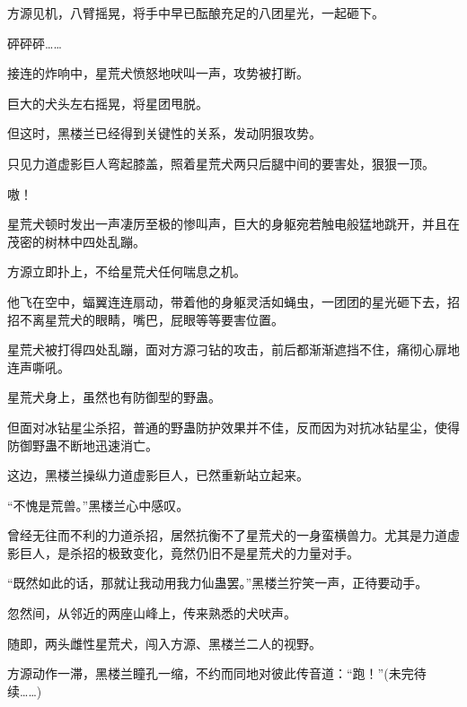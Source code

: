 \begin{this_body}
方源见机，八臂摇晃，将手中早已酝酿充足的八团星光，一起砸下。

砰砰砰……

接连的炸响中，星荒犬愤怒地吠叫一声，攻势被打断。

巨大的犬头左右摇晃，将星团甩脱。

但这时，黑楼兰已经得到关键性的关系，发动阴狠攻势。

只见力道虚影巨人弯起膝盖，照着星荒犬两只后腿中间的要害处，狠狠一顶。

嗷！

星荒犬顿时发出一声凄厉至极的惨叫声，巨大的身躯宛若触电般猛地跳开，并且在茂密的树林中四处乱蹦。

方源立即扑上，不给星荒犬任何喘息之机。

他飞在空中，蝠翼连连扇动，带着他的身躯灵活如蝇虫，一团团的星光砸下去，招招不离星荒犬的眼睛，嘴巴，屁眼等等要害位置。

星荒犬被打得四处乱蹦，面对方源刁钻的攻击，前后都渐渐遮挡不住，痛彻心扉地连声嘶吼。

星荒犬身上，虽然也有防御型的野蛊。

但面对冰钻星尘杀招，普通的野蛊防护效果并不佳，反而因为对抗冰钻星尘，使得防御野蛊不断地迅速消亡。

这边，黑楼兰操纵力道虚影巨人，已然重新站立起来。

“不愧是荒兽。”黑楼兰心中感叹。

曾经无往而不利的力道杀招，居然抗衡不了星荒犬的一身蛮横兽力。尤其是力道虚影巨人，是杀招的极致变化，竟然仍旧不是星荒犬的力量对手。

“既然如此的话，那就让我动用我力仙蛊罢。”黑楼兰狞笑一声，正待要动手。

忽然间，从邻近的两座山峰上，传来熟悉的犬吠声。

随即，两头雌性星荒犬，闯入方源、黑楼兰二人的视野。

方源动作一滞，黑楼兰瞳孔一缩，不约而同地对彼此传音道：“跑！”(未完待续……)

\end{this_body}

